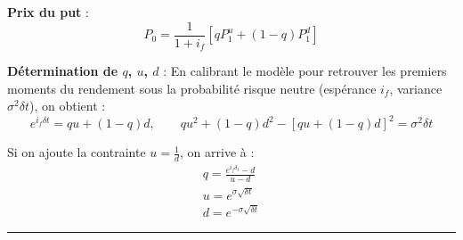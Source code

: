 \begin{f}
\textbf{Prix du put} :
\[
P_{0} = \frac{1}{1+i_f} \left[ q P_{1}^{u} + (1 - q) P_{1}^{d} \right]
\]

\textbf{Détermination de \(q\), \(u\), \(d\)} :  
En calibrant le modèle pour retrouver les premiers moments du rendement sous la probabilité risque neutre (espérance \(i_f\), variance \(\sigma^2 \delta t\)), on obtient :
\[
e^{i_{f} \delta t} = q u + (1-q) d, \qquad q u^2 + (1-q) d^2 - [q u + (1-q) d]^2 = \sigma^2 \delta t
\]

Si on ajoute la contrainte \(u = \frac{1}{d}\), on arrive à :
\[
\begin{array}{l}
	q = \frac{e^{i_f \delta_t} - d}{u - d} \\
	u = e^{\sigma \sqrt{\delta t}} \\
	d = e^{-\sigma \sqrt{\delta t}}
\end{array}
\]

\end{f}
\hrule

